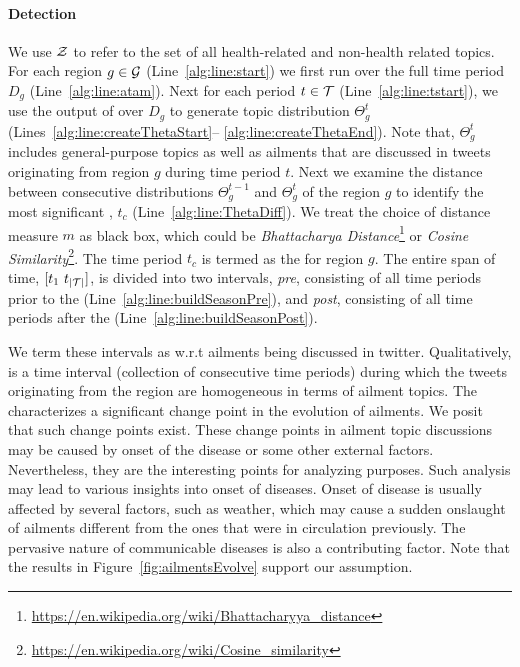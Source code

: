 \paragraph{\change Detection}
We use $\mathcal{Z}$ to refer to the set of all health-related and non-health 
related topics. For each region $g \in \mathcal{G}$ (Line~\ref{alg:line:start}) 
we first run \atam over the full time period $D_g$ (Line~\ref{alg:line:atam}).
Next for each period $t\in \mathcal{T}$ (Line~\ref{alg:line:tstart}), 
we use the output of \atam over $D_g$ to generate 
topic distribution $\Theta_g^t$ (Lines~\ref{alg:line:createThetaStart}--
\ref{alg:line:createThetaEnd}). 
Note that, $\Theta_g^t$ includes general-purpose topics as well as ailments that are
discussed in tweets originating from region $g$ during time period $t$.  
Next we examine the distance between consecutive distributions
$\Theta_g^{t-1}$ and $\Theta_g^t$ of the region $g$ 
to identify the most significant \texttt{\emph{\change}}, $t_c$ (Line~\ref{alg:line:ThetaDiff}).
We treat the choice of distance measure $m$ as black box, 
which could be \emph{Bhattacharya Distance}\footnote{\url{https://en.wikipedia.org/wiki/Bhattacharyya_distance}} or \emph{Cosine Similarity}\footnote{\url{ https://en.wikipedia.org/wiki/Cosine_similarity}}. 
The time period $t_c$ is termed as the \texttt{\emph{\change}} for
region $g$. The entire span of time, $[t_1\ t_{|\mathcal{T}|}]$, is divided 
into two intervals, \emph{pre}, consisting
of all time periods prior to the \emph{\change} (Line~\ref{alg:line:buildSeasonPre}), 
and \emph{post}, consisting of all time periods after 
the \emph{\change} (Line~\ref{alg:line:buildSeasonPost}).

We term these intervals as \seasons w.r.t ailments being discussed in twitter. Qualitatively, \season is a 
time interval (collection of consecutive time periods) during which
the tweets originating from the region are homogeneous in terms of ailment topics. 
The \texttt{\emph{\change}} characterizes a significant change point
in the evolution of ailments. We posit that such change points exist. These change points in ailment topic discussions
may be caused by onset of the disease or some other external factors. Nevertheless, they are the interesting points for analyzing purposes.
Such analysis may lead to various insights into onset of diseases.
Onset of disease is usually affected by several factors, such as weather, which may cause
a sudden onslaught of ailments different from the ones that were in circulation
previously. The pervasive nature of communicable diseases is also a contributing
factor. Note that the results in Figure~\ref{fig:ailmentsEvolve} support our assumption.

